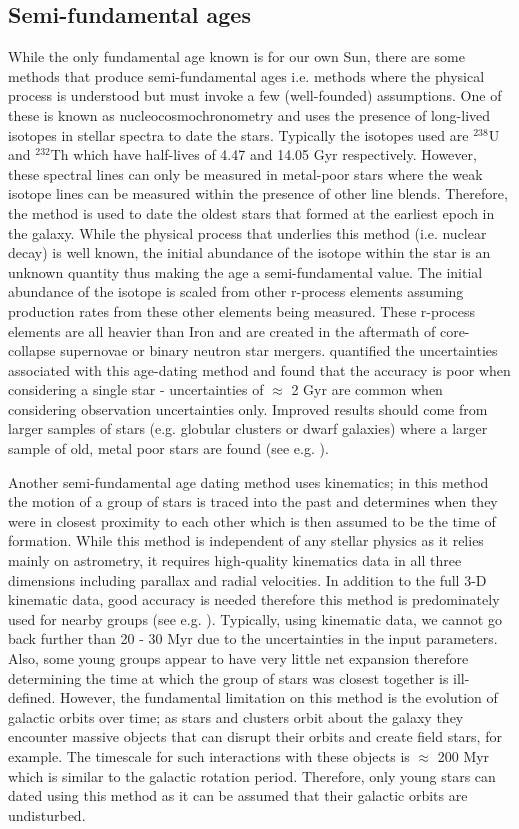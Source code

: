 \subsection{Semi-fundamental ages}
While the only fundamental age known is for our own Sun, there are some methods that produce semi-fundamental ages i.e. methods where the physical process is understood but must invoke a few (well-founded) assumptions. One of these is known as nucleocosmochronometry and uses the presence of long-lived isotopes in stellar spectra to date the stars. Typically the isotopes used are $^{238}$U and $^{232}$Th which have half-lives of 4.47 and 14.05 Gyr respectively. However, these spectral lines can only be measured in metal-poor stars where the weak isotope lines can be measured within the presence of other line blends. Therefore, the method is used to date the oldest stars that formed at the earliest epoch in the galaxy. While the physical process that underlies this method (i.e. nuclear decay) is well known, the initial abundance of the isotope within the star is an unknown quantity thus making the age a semi-fundamental value. The initial abundance of the isotope is scaled from other r-process elements assuming production rates from these other elements being measured. These r-process elements are all heavier than Iron and are created in the aftermath of core-collapse supernovae or binary neutron star mergers. \citet{Ludwig_etal_2010} quantified the uncertainties associated with this age-dating method and found that the accuracy is poor when considering a single star - uncertainties of $\approx$ 2 Gyr are common when considering observation uncertainties only. Improved results should come from larger samples of stars (e.g. globular clusters or dwarf galaxies) where a larger sample of old, metal poor stars are found (see e.g. \citealt{Hansen_etal_2018}). 

Another semi-fundamental age dating method uses kinematics; in this method the motion of a group of stars is traced into the past and determines when they were in closest proximity to each other which is then assumed to be the time of formation. While this method is independent of any stellar physics as it relies mainly on astrometry, it requires high-quality kinematics data in all three dimensions including parallax and radial velocities. In addition to the full 3-D kinematic data, good accuracy is needed therefore this method is predominately used for nearby groups (see e.g. \citealt{Makarov_2007}). Typically, using kinematic data, we cannot go back further than 20 - 30 Myr due to the uncertainties in the input parameters. Also, some young groups appear to have very little net expansion \citep{Mamajek_2005} therefore determining the time at which the group of stars was closest together is ill-defined. However, the fundamental limitation on this method is the evolution of galactic orbits over time; as stars and clusters orbit about the galaxy they encounter massive objects that can disrupt their orbits and create field stars, for example. The timescale for such interactions with these objects is $\approx$ 200 Myr \citep{Janes_Phelps_1994} which is similar to the galactic rotation period. Therefore, only young stars can dated using this method as it can be assumed that their galactic orbits are undisturbed.

